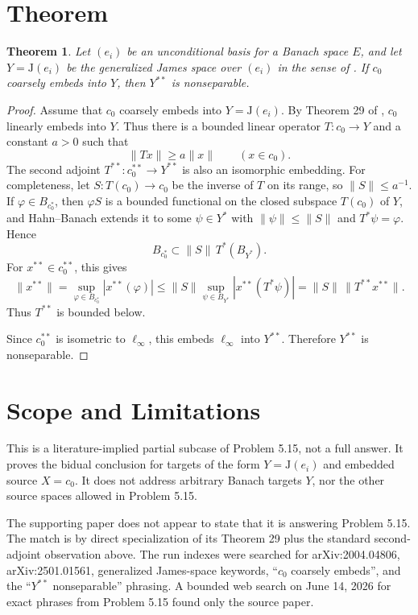 \documentclass[11pt]{article}
\newtheorem{theorem}{Theorem}
\newcommand{\ellinf}{\ell_\infty}
\newcommand{\co}{c_0}
\newcommand{\J}{\mathrm{J}}
\begin{document}
\section*{Theorem}

\begin{theorem}
Let $(e_i)$ be an unconditional basis for a Banach space $E$, and let
$Y=\J(e_i)$ be the generalized James space over $(e_i)$ in the sense of
\cite{JKS}. If $\co$ coarsely embeds into $Y$, then $Y^{**}$ is nonseparable.
\end{theorem}

\begin{proof}
Assume that $\co$ coarsely embeds into $Y=\J(e_i)$. By Theorem 29 of
\cite{JKS}, $\co$ linearly embeds into $Y$. Thus there is a bounded linear
operator $T:\co\to Y$ and a constant $a>0$ such that
\[
\|Tx\|\ge a\|x\| \qquad (x\in \co).
\]
The second adjoint $T^{**}:\co^{**}\to Y^{**}$ is also an isomorphic
embedding. For completeness, let $S:T(\co)\to \co$ be the inverse of $T$ on
its range, so $\|S\|\le a^{-1}$. If $\varphi\in B_{\co^*}$, then
\(\varphi S\) is a bounded functional on the closed subspace \(T(\co)\) of
\(Y\), and Hahn--Banach extends it to some \(\psi\in Y^*\) with
\(\|\psi\|\le \|S\|\) and \(T^*\psi=\varphi\). Hence
\[
B_{\co^*}\subset \|S\|\,T^*(B_{Y^*}).
\]
For \(x^{**}\in \co^{**}\), this gives
\[
\|x^{**}\|
=\sup_{\varphi\in B_{\co^*}} |x^{**}(\varphi)|
\le \|S\|\sup_{\psi\in B_{Y^*}} |x^{**}(T^*\psi)|
=\|S\|\,\|T^{**}x^{**}\|.
\]
Thus \(T^{**}\) is bounded below.

Since $\co^{**}$ is isometric to $\ellinf$, this embeds $\ellinf$ into
$Y^{**}$. Therefore $Y^{**}$ is nonseparable.
\end{proof}

\section*{Scope and Limitations}

This is a literature-implied partial subcase of Problem 5.15, not a full
answer. It proves the bidual conclusion for targets of the form
$Y=\J(e_i)$ and embedded source $X=\co$. It does not address arbitrary Banach
targets $Y$, nor the other source spaces allowed in Problem 5.15.

The supporting paper does not appear to state that it is answering Problem
5.15. The match is by direct specialization of its Theorem 29 plus the
standard second-adjoint observation above. The run indexes were searched for
arXiv:2004.04806, arXiv:2501.01561, generalized James-space keywords,
``$c_0$ coarsely embeds'', and the ``$Y^{**}$ nonseparable'' phrasing. A
bounded web search on June 14, 2026 for exact phrases from Problem 5.15 found
only the source paper.
\end{document}
